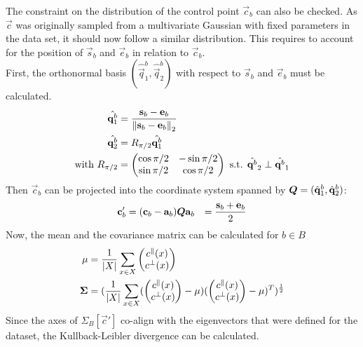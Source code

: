 The constraint on the distribution of the control point $\vec{c}_b$ can also be checked.
As $\vec{c}$ was originally sampled from a multivariate Gaussian with fixed parameters in the data set, it should now follow a similar distribution.
This requires to account for the position of  $\vec{s}_b$ and $\vec{e}_b$ in relation to $\vec{c}_b$.\\
First, the orthonormal basis $(\hat{\vec{q}}^b_1, \hat{\vec{q}}^b_2)$ with respect to $\vec{s}_b$ and $\vec{e}_b$ must be calculated.
\begin{align}
    \hat{\mathbf{q}^b_1} & = \frac{\mathbf{s}_b - \mathbf{e}_b}{\left\lVert\mathbf{s}_b - \mathbf{e}_b\right\rVert_2} \\
    \hat{\mathbf{q}^b_2} & = R_{\pi/2} \hat{\mathbf{q}^b_1} \\
    \text{with } R_{\pi/2} & =
    \begin{pmatrix}
        \cos \pi/2 & -\sin \pi/2 \\
        \sin \pi/2 & \cos \pi/2
    \end{pmatrix} \text{ s.t. } \hat{\mathbf{q}^b}_2 \perp \hat{\mathbf{q}^b}_1
\end{align}
Then $\vec{c}_b$ can be projected into the coordinate system spanned by  $\boldsymbol{Q} = (\hat{\mathbf{q}}^b_1, \hat{\mathbf{q}}^b_2)$:
\begin{align}
    \mathbf{c}'_b & = (\mathbf{c}_b - \mathbf{a}_b) \boldsymbol{Q}
    \mathbf{a}_b & = \frac{\mathbf{s}_b + \mathbf{e}_b}{2}
\end{align}
Now, the mean and the covariance matrix can be calculated for $b \in B$
\begin{align}
    \mathbf{\mu} & = \frac{1}{\vert X \vert}\sum_{x \in X} \begin{pmatrix} c^\parallel(x) \\ c^\bot(x) \end{pmatrix} \\
    \boldsymbol{\Sigma} & = (\frac{1}{\vert X \vert} \sum_{x \in X}
        (\begin{pmatrix} c^\parallel(x) \\ c^\bot(x) \end{pmatrix} - \mathbf{\mu})
        (\begin{pmatrix} c^\parallel(x) \\ c^\bot(x) \end{pmatrix} - \mathbf{\mu})^T
        )^{\frac{1}{2}} \\
\end{align}
Since the axes of $\Sigma_B[\vec{c}']$ co-align with the eigenvectors that were defined for the dataset, the Kullback-Leibler divergence can be calculated.
